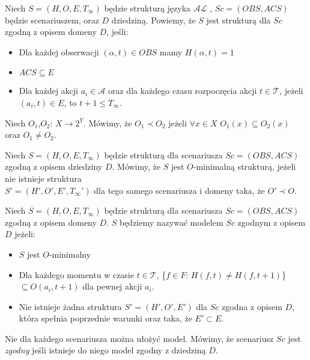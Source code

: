    \begin{definition}
   Niech $S = (H,O,E,T_{\infty})$ będzie strukturą języka $\mathcal{AL}$ , $ Sc=(OBS,ACS) $ będzie scenariuszem,
    oraz $ D $ dziedziną. Powiemy, że $ S $ jest strukturą dla $Sc$ zgodną z opisem domeny $D$, jeśli:
   		\begin{itemize}
     		\item Dla każdej obserwacji $(\alpha,t )\in OBS$ mamy $H(\alpha,t )=1$
     		\item $ACS \subseteq E$
     		\item Dla każdej akcji $ {a_i \in \mathcal{A}}$ oraz dla każdego czasu rozpoczęcia akcji
     		$t \in \mathcal{T}$, jeżeli $(a_i,t) \in E $, to $t+1 \leq T_{\infty}$.
    		\end{itemize}
   \end{definition}
   \begin{definition}
	   Niech $O_{1}$,$O_{2}$: $X \longrightarrow 2^{Y}$. Mówimy, że $O_{1} \prec O_{2}$ jeżeli
	   $\forall x\in X$ $O_{1}(x)\subseteq O_{2}(x)$ oraz $O_{1}\neq O_{2}$.
   \end{definition}

   \begin{definition}
   Niech $S=(H,O,E,T_{\infty})$ będzie strukturą dla scenariusza $Sc=(OBS,ACS)$ zgodną z opisem dziedziny
   $D$. Mówimy, że $S$ jest $O$-minimalną strukturą, jeżeli nie istnieje struktura \\$S'=(H',O',E',T_{\infty}')$
   dla tego samego scenariusza i domeny taka, że $O'\prec O$.
   \end{definition}
   \begin{definition}
   Niech $S=(H,O,E,T_{\infty})$ będzie strukturą dla scenariusza $Sc=(OBS,ACS)$ zgodną z opisem domeny
   $D$. $S$ będziemy nazywać modelem $Sc$ zgodnym z opisem $D$ jeżeli:
   \begin{itemize}
		\item $S$ jest $O$-minimalny
		\item Dla każdego momentu w czasie $t \in \mathcal{T}$,  \{$f\in F$: $H(f,t)\neq H(f,t+1) $\}
		$\subseteq O(a_i,t+1)$ dla pewnej akcji $a_i$.
		\item Nie istnieje żadna struktura $S'=(H',O',E')$ dla $Sc$ zgodna z opisem $D$,
		która spełnia poprzednie warunki oraz taka, że $E'\subset E$.
   \end{itemize}
\end{definition}

\begin{remark}
Nie dla każdego scenariusza można ułożyć model. Mówimy, że scenariusz $Sc$ jest \textit{zgodny}
jeśli istnieje do niego model zgodny z dziedziną $D$.
\end{remark}

